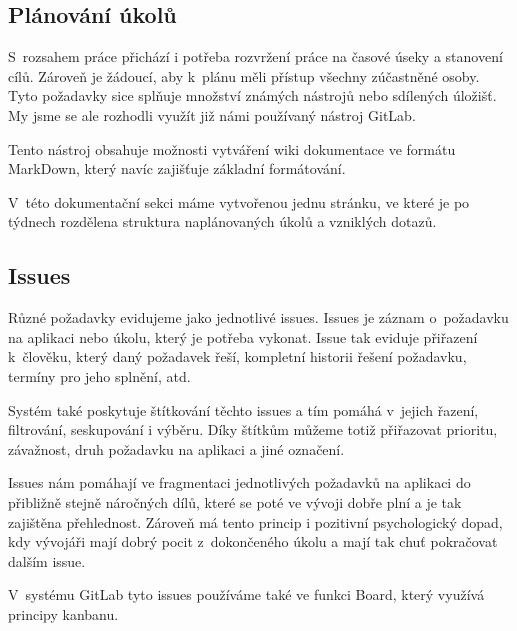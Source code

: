 \documentclass[czech,BP]{thesiskiv}
\begin{document}
\subsection{Plánování úkolů}
	\par S~rozsahem práce přichází i potřeba rozvržení práce na časové úseky a stanovení cílů. Zároveň je žádoucí, aby k~plánu měli přístup všechny zúčastněné osoby. Tyto požadavky sice splňuje množství známých nástrojů nebo sdílených úložišť. My jsme se ale rozhodli využít již námi používaný nástroj GitLab.
	\par Tento nástroj obsahuje možnosti vytváření wiki dokumentace ve formátu MarkDown, který navíc zajišťuje základní formátování.
	\par V~této dokumentační sekci máme vytvořenou jednu stránku, ve které je po týdnech rozdělena struktura naplánovaných úkolů a vzniklých dotazů.
\subsection{Issues}
	\par Různé požadavky evidujeme jako jednotlivé issues. Issues je záznam o~požadavku na aplikaci nebo úkolu, který je potřeba vykonat. Issue tak eviduje přiřazení k~člověku, který daný požadavek řeší, kompletní historii řešení požadavku, termíny pro jeho splnění, atd.
	\par Systém také poskytuje štítkování těchto issues a tím pomáhá v~jejich řazení, filtrování, seskupování i výběru. Díky štítkům můžeme totiž přiřazovat prioritu, závažnost, druh požadavku na aplikaci a jiné označení.
	\par Issues nám pomáhají ve fragmentaci  jednotlivých požadavků na aplikaci do přibližně stejně náročných dílů, které se poté ve vývoji dobře plní a je tak zajištěna přehlednost. Zároveň má tento princip i pozitivní psychologický dopad, kdy vývojáři mají dobrý pocit z~dokončeného úkolu a mají tak chuť pokračovat dalším issue.
	\par V~systému GitLab tyto issues používáme také ve funkci Board, který využívá principy kanbanu.
\end{document}
